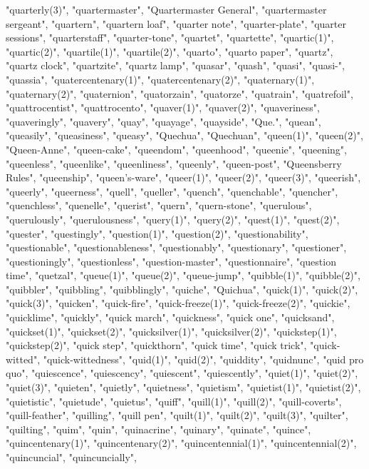 "quarterly(3)",
"quartermaster",
"Quartermaster General",
"quartermaster sergeant",
"quartern",
"quartern loaf",
"quarter note",
"quarter-plate",
"quarter sessions",
"quarterstaff",
"quarter-tone",
"quartet",
"quartette",
"quartic(1)",
"quartic(2)",
"quartile(1)",
"quartile(2)",
"quarto",
"quarto paper",
"quartz",
"quartz clock",
"quartzite",
"quartz lamp",
"quasar",
"quash",
"quasi",
"quasi-",
"quassia",
"quatercentenary(1)",
"quatercentenary(2)",
"quaternary(1)",
"quaternary(2)",
"quaternion",
"quatorzain",
"quatorze",
"quatrain",
"quatrefoil",
"quattrocentist",
"quattrocento",
"quaver(1)",
"quaver(2)",
"quaveriness",
"quaveringly",
"quavery",
"quay",
"quayage",
"quayside",
"Que.",
"quean",
"queasily",
"queasiness",
"queasy",
"Quechua",
"Quechuan",
"queen(1)",
"queen(2)",
"Queen-Anne",
"queen-cake",
"queendom",
"queenhood",
"queenie",
"queening",
"queenless",
"queenlike",
"queenliness",
"queenly",
"queen-post",
"Queensberry Rules",
"queenship",
"queen's-ware",
"queer(1)",
"queer(2)",
"queer(3)",
"queerish",
"queerly",
"queerness",
"quell",
"queller",
"quench",
"quenchable",
"quencher",
"quenchless",
"quenelle",
"querist",
"quern",
"quern-stone",
"querulous",
"querulously",
"querulousness",
"query(1)",
"query(2)",
"quest(1)",
"quest(2)",
"quester",
"questingly",
"question(1)",
"question(2)",
"questionability",
"questionable",
"questionableness",
"questionably",
"questionary",
"questioner",
"questioningly",
"questionless",
"question-master",
"questionnaire",
"question time",
"quetzal",
"queue(1)",
"queue(2)",
"queue-jump",
"quibble(1)",
"quibble(2)",
"quibbler",
"quibbling",
"quibblingly",
"quiche",
"Quichua",
"quick(1)",
"quick(2)",
"quick(3)",
"quicken",
"quick-fire",
"quick-freeze(1)",
"quick-freeze(2)",
"quickie",
"quicklime",
"quickly",
"quick march",
"quickness",
"quick one",
"quicksand",
"quickset(1)",
"quickset(2)",
"quicksilver(1)",
"quicksilver(2)",
"quickstep(1)",
"quickstep(2)",
"quick step",
"quickthorn",
"quick time",
"quick trick",
"quick-witted",
"quick-wittedness",
"quid(1)",
"quid(2)",
"quiddity",
"quidnunc",
"quid pro quo",
"quiescence",
"quiescency",
"quiescent",
"quiescently",
"quiet(1)",
"quiet(2)",
"quiet(3)",
"quieten",
"quietly",
"quietness",
"quietism",
"quietist(1)",
"quietist(2)",
"quietistic",
"quietude",
"quietus",
"quiff",
"quill(1)",
"quill(2)",
"quill-coverts",
"quill-feather",
"quilling",
"quill pen",
"quilt(1)",
"quilt(2)",
"quilt(3)",
"quilter",
"quilting",
"quim",
"quin",
"quinacrine",
"quinary",
"quinate",
"quince",
"quincentenary(1)",
"quincentenary(2)",
"quincentennial(1)",
"quincentennial(2)",
"quincuncial",
"quincuncially",

